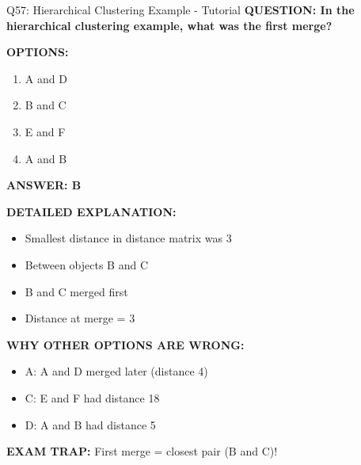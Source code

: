 \documentclass[8pt]{beamer}
\begin{document}
	\begin{frame}{Q57: Hierarchical Clustering Example - Tutorial}
		\fontsize{6.5}{7.5}\selectfont
		\textbf{QUESTION: In the hierarchical clustering example, what was the first merge?}
		
		\vspace{0.1cm}
		\textbf{OPTIONS:}
		\begin{enumerate}
			\item A and D
			\item B and C
			\item E and F
			\item A and B
		\end{enumerate}
		
		\vspace{0.1cm}
		\textcolor{myblue}{\textbf{ANSWER: B}}
		
		\vspace{0.1cm}
		\textbf{DETAILED EXPLANATION:}
		\begin{itemize}
			\item Smallest distance in distance matrix was 3
			\item Between objects B and C
			\item B and C merged first
			\item Distance at merge = 3
		\end{itemize}
		
		\vspace{0.1cm}
		\textcolor{myred}{\textbf{WHY OTHER OPTIONS ARE WRONG:}}
		\begin{itemize}
			\item \textcolor{myred}{A:} A and D merged later (distance 4)
			\item \textcolor{myred}{C:} E and F had distance 18
			\item \textcolor{myred}{D:} A and B had distance 5
		\end{itemize}
		
		\textcolor{myred}{\textbf{EXAM TRAP:}} First merge = \textcolor{myblue}{closest pair} (B and C)!
	\end{frame}
	
\end{document}
